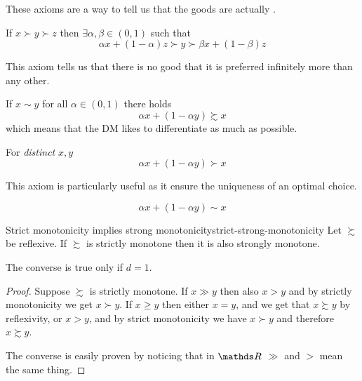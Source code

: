 \documentclass[12pt]{extarticle}
\begin{document}
\begin{description}
	      These axioms are a way to tell us that the goods are actually .

	\item[Archimedean] If $x \succ y \succ z$ then $\exists \alpha, \beta \in (0, 1)$ such that
	      \begin{equation}
		      \alpha x + (1- \alpha)z \succ y \succ \beta x + (1-\beta) z
	      \end{equation}

	      This axiom tells us that there is no good that it is preferred infinitely more than any other.

	\item[Convexity] If $x \sim y$ for all $\alpha \in (0, 1)$ there holds
	      \begin{equation}
		      \alpha x + (1-\alpha y) \succsim x
	      \end{equation}
	      which means that the DM likes to differentiate as much as possible.

	      \begin{description}[font=\normalfont\itshape\space]
		      \item[Strict convexity] For \emph{distinct} $x, y$
		            \begin{equation}
			            \alpha x + (1-\alpha y) \succ x
		            \end{equation}

		            This axiom is particularly useful as it ensure the uniqueness of an optimal choice.
		      \item[Affinity]
		            \begin{equation}
			            \alpha x + (1-\alpha y) \sim x
		            \end{equation}

	      \end{description}
\end{description}

\begin{lemma}{Strict monotonicity implies strong monotonicity}{strict-strong-monotonicity}
	Let $\succsim$ be reflexive.
	If $\succsim$ is strictly monotone then it is also strongly monotone.

	The converse is true only if $d = 1$.
\end{lemma}

\begin{proof}
	Suppose $\succsim$ is strictly monotone.
	If $x\gg y$ then also $x \gt y$ and by strictly monotonicity we get $x \succ y$.
	If $x\geq y$ then either $x = y$, and we get that $x \succsim y$ by reflexivity,
	or $x > y$, and by strict monotonicity we have $x\succ y$ and therefore $x \succsim y$.

	The converse is easily proven by noticing that in $\R$ $\gg$ and $\gt$ mean the same thing.
\end{proof}
\end{document}
